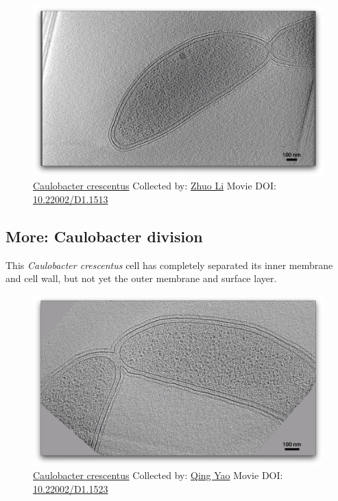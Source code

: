 \documentclass[]{tufte-book}
\begin{document}
\begin{figure}
\includegraphics{movie_stills/5_7} \caption[\protect\hyperlink{tree}{Caulobacter crescentus} Collected by:
\protect\hyperlink{zhuo_li}{Zhuo Li} Movie DOI:
\href{https://doi.org/10.22002/D1.1513}{10.22002/D1.1513}]{\protect\hyperlink{tree}{Caulobacter crescentus} Collected by:
\protect\hyperlink{zhuo_li}{Zhuo Li} Movie DOI:
\href{https://doi.org/10.22002/D1.1513}{10.22002/D1.1513}}\label{fig:5-7}
\end{figure}

\hypertarget{Caulobacter_division}{\subsection*{More: Caulobacter
division}\label{Caulobacter_division}}

This \emph{Caulobacter crescentus} cell has completely separated its
inner membrane and cell wall, but not yet the outer membrane and surface
layer.





\begin{figure}
\includegraphics{movie_stills/5_7a} \caption[\protect\hyperlink{tree}{Caulobacter crescentus} Collected
by: \protect\hyperlink{qing_yao}{Qing Yao} Movie DOI:
\href{https://doi.org/10.22002/D1.1523}{10.22002/D1.1523}]{\protect\hyperlink{tree}{Caulobacter crescentus} Collected
by: \protect\hyperlink{qing_yao}{Qing Yao} Movie DOI:
\href{https://doi.org/10.22002/D1.1523}{10.22002/D1.1523}}\label{fig:5-7a}
\end{figure}
\end{document}
